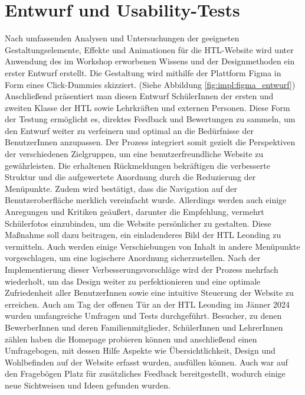 \section{Entwurf und Usability-Tests}
Nach umfassenden Analysen und Untersuchungen der geeigneten Gestaltungselemente, Effekte und Animationen für die HTL-Website wird unter Anwendung des im Workshop 
erworbenen Wissens und der Designmethoden ein erster Entwurf erstellt. Die Gestaltung wird mithilfe der Plattform Figma in Form eines 
Click-Dummies skizziert. (Siehe Abbildung \ref{fig:impl:figma_entwurf}) Anschließend präsentiert man diesen Entwurf SchülerInnen der ersten und zweiten Klasse der HTL sowie Lehrkräften 
und externen Personen. Diese Form der Testung ermöglicht es, direktes Feedback und Bewertungen zu sammeln, um den Entwurf 
weiter zu verfeinern und optimal an die Bedürfnisse der BenutzerInnen anzupassen. Der Prozess integriert somit gezielt die Perspektiven 
der verschiedenen Zielgruppen, um eine benutzerfreundliche Website zu gewährleisten. 
Die erhaltenen Rückmeldungen bekräftigen die verbesserte Struktur und die aufgewertete Anordnung durch die Reduzierung der Menüpunkte. 
Zudem wird bestätigt, dass die Navigation auf der Benutzeroberfläche merklich vereinfacht wurde. Allerdings werden auch einige Anregungen 
und Kritiken geäußert, darunter die Empfehlung, vermehrt Schülerfotos einzubinden, um die Website persönlicher zu gestalten. Diese Maßnahme 
soll dazu beitragen, ein einladenderes Bild der HTL Leonding zu vermitteln. Auch werden einige Verschiebungen von Inhalt in andere Menüpunkte 
vorgeschlagen, um eine logischere Anordnung sicherzustellen. 
Nach der Implementierung dieser Verbesserungsvorschläge wird der Prozess mehrfach wiederholt, um das Design weiter zu perfektionieren und 
eine optimale Zufriedenheit aller BenutzerInnen sowie eine intuitive Steuerung der Website zu erreichen. Auch am Tag der offenen Tür an der HTL Leonding
im Jänner 2024 wurden umfangreiche Umfragen und Tests durchgeführt. Besucher, zu denen BewerberInnen und deren Familienmitglieder, SchülerInnen und LehrerInnen 
zählen haben die Homepage probieren können und anschließend einen Umfragebogen, mit dessen Hilfe Aspekte wie Übersichtlichkeit, Design und Wohlbefinden auf der Website
erfasst wurden, ausfüllen können. Auch war auf den Fragebögen Platz für zusätzliches Feedback bereitgestellt, wodurch einige neue Sichtweisen und 
Ideen gefunden wurden.  

